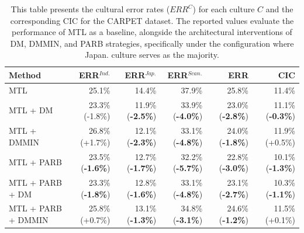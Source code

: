 \begin{table} [H]
\centering
\scriptsize
\begin{tabular}{lrrrrr}
\toprule
\textbf{Method} & \textbf{ERR$^{Ind.}$} & \textbf{ERR$^{Jap.}$} & \textbf{ERR$^{Scan.}$} & \textbf{ERR} & \textbf{CIC} \\
\midrule
MTL          & 25.1\% & 14.4\% & 37.9\% & 25.8\% & 11.4\% \\
MTL + DM     & 23.3\% (-1.8\%) & 11.9\% (\textbf{-2.5\%}) & 33.9\% (\textbf{-4.0\%}) & 23.0\% (\textbf{-2.8\%}) & 11.1\% (\textbf{-0.3\%}) \\
MTL +  DMMIN & 26.8\% (+1.7\%) & 12.1\% (\textbf{-2.3\%}) & 33.1\% (\textbf{-4.8\%}) & 24.0\% (\textbf{-1.8\%}) & 11.9\% (+0.5\%) \\
\hline
MTL + PARB     & 23.5\% (\textbf{-1.6\%}) & 12.7\% (\textbf{-1.7\%}) & 32.2\% (\textbf{-5.7\%}) & 22.8\% (\textbf{-3.0\%}) & 10.1\% (\textbf{-1.3\%})  \\
MTL + PARB + DM & 23.3\% (\textbf{-1.8\%}) & 12.8\% (\textbf{-1.6\%}) & 33.1\% (\textbf{-4.8\%}) & 23.1\% (\textbf{-2.7\%}) & 10.3\% (\textbf{-1.1\%}) \\
MTL + PARB + DMMIN & 25.8\% (+0.7\%) & 13.1\% (\textbf{-1.3\%}) & 34.8\% (\textbf{-3.1\%}) & 24.6\% (\textbf{-1.2\%}) & 11.5\% (+0.1\%) \\
\bottomrule
\end{tabular}
\caption{This table presents the cultural error rates ($ERR^C$) for each culture $C$ and the corresponding CIC for the CARPET dataset. The reported values evaluate the performance of MTL as a baseline, alongside the architectural interventions of DM, DMMIN, and PARB strategies, specifically under the configuration where Japan. culture serves as the majority.}
\label{ch3:tab:mtl_and_da:CJ}
\end{table}
%
%
